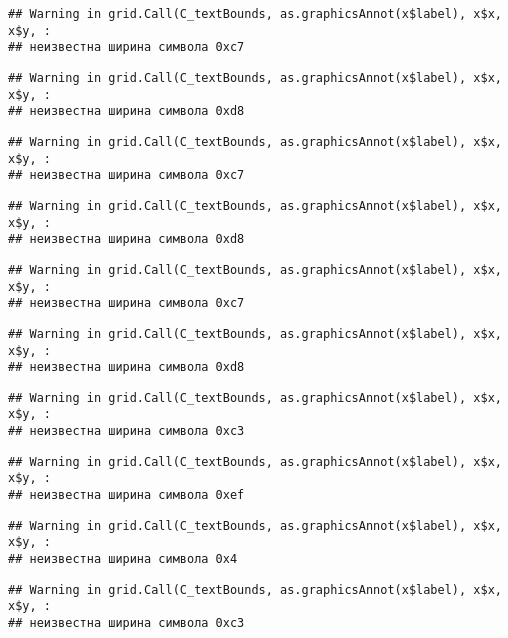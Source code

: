 \documentclass[
]{article}
\begin{document}
\begin{verbatim}
## Warning in grid.Call(C_textBounds, as.graphicsAnnot(x$label), x$x, x$y, :
## неизвестна ширина символа 0xc7
\end{verbatim}

\begin{verbatim}
## Warning in grid.Call(C_textBounds, as.graphicsAnnot(x$label), x$x, x$y, :
## неизвестна ширина символа 0xd8
\end{verbatim}

\begin{verbatim}
## Warning in grid.Call(C_textBounds, as.graphicsAnnot(x$label), x$x, x$y, :
## неизвестна ширина символа 0xc7
\end{verbatim}

\begin{verbatim}
## Warning in grid.Call(C_textBounds, as.graphicsAnnot(x$label), x$x, x$y, :
## неизвестна ширина символа 0xd8
\end{verbatim}

\begin{verbatim}
## Warning in grid.Call(C_textBounds, as.graphicsAnnot(x$label), x$x, x$y, :
## неизвестна ширина символа 0xc7
\end{verbatim}

\begin{verbatim}
## Warning in grid.Call(C_textBounds, as.graphicsAnnot(x$label), x$x, x$y, :
## неизвестна ширина символа 0xd8
\end{verbatim}

\begin{verbatim}
## Warning in grid.Call(C_textBounds, as.graphicsAnnot(x$label), x$x, x$y, :
## неизвестна ширина символа 0xc3
\end{verbatim}

\begin{verbatim}
## Warning in grid.Call(C_textBounds, as.graphicsAnnot(x$label), x$x, x$y, :
## неизвестна ширина символа 0xef
\end{verbatim}

\begin{verbatim}
## Warning in grid.Call(C_textBounds, as.graphicsAnnot(x$label), x$x, x$y, :
## неизвестна ширина символа 0x4
\end{verbatim}

\begin{verbatim}
## Warning in grid.Call(C_textBounds, as.graphicsAnnot(x$label), x$x, x$y, :
## неизвестна ширина символа 0xc3
\end{verbatim}
\end{document}
